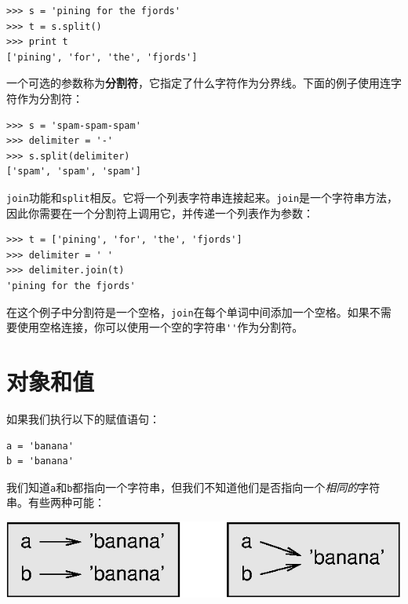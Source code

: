 
\beforeverb
\begin{verbatim}
>>> s = 'pining for the fjords'
>>> t = s.split()
>>> print t
['pining', 'for', 'the', 'fjords']
\end{verbatim}
\afterverb
%
一个可选的参数称为{\bf 分割符}，它指定了什么字符作为分界线。下面的例子使用连字符作为分割符：


\beforeverb
\begin{verbatim}
>>> s = 'spam-spam-spam'
>>> delimiter = '-'
>>> s.split(delimiter)
['spam', 'spam', 'spam']
\end{verbatim}
\afterverb
%
{\tt join}功能和{\tt split}相反。它将一个列表字符串连接起来。{\tt join}是一个字符串方法，因此你需要在一个分割符上调用它，并传递一个列表作为参数：


\beforeverb
\begin{verbatim}
>>> t = ['pining', 'for', 'the', 'fjords']
>>> delimiter = ' '
>>> delimiter.join(t)
'pining for the fjords'
\end{verbatim}
\afterverb
%
在这个例子中分割符是一个空格，{\tt join}在每个单词中间添加一个空格。如果不需要使用空格连接，你可以使用一个空的字符串\verb"''"作为分割符。



\section{对象和值}


如果我们执行以下的赋值语句：

\beforeverb
\begin{verbatim}
a = 'banana'
b = 'banana'
\end{verbatim}
\afterverb
%
我们知道{\tt a}和{\tt b}都指向一个字符串，但我们不知道他们是否指向一个{\em 相同的}字符串。有些两种可能：


\beforefig
\centerline{\includegraphics{figs/list1.eps}}
\afterfig

